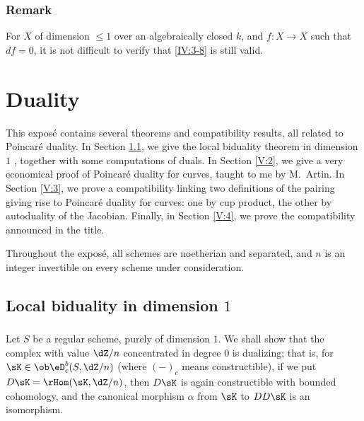 \documentclass[oneside]{book}
\begin{document}
\subsection{Remark}\label{IV:3-9}

For $X$ of dimension $\leqslant 1$ over an algebraically closed $k$, and
$f:X\to X$ such that $d f=0$, it is not difficult to verify that
\ref{IV:3-8} is still valid.



\chapter{Duality}\label{V}

This exposé contains several theorems and compatibility results, all related
to Poincaré duality. In Section \ref{V:1}, we give the local biduality theorem
in dimension $1$ \cite[I.5.1]{sga5}, together with some computations of
duals. In Section \ref{V:2}, we give a very economical proof of Poincaré
duality for curves, taught to me by M.\ Artin. In Section \ref{V:3}, we prove
a compatibility linking two definitions of the pairing giving rise to
Poincaré duality for curves: one by cup product, the other by autoduality of
the Jacobian. Finally, in Section \ref{V:4}, we prove the compatibility
announced in the title.

Throughout the exposé, all schemes are noetherian and separated, and $n$ is
an integer invertible on every scheme under consideration.


\section{Local biduality in dimension \texorpdfstring{$1$}{1}}\label{V:1}


\subsection{}\label{V:1-1}

Let $S$ be a regular scheme, purely of dimension $1$. We shall show that the
complex with value $\dZ/n$ concentrated in degree $0$ is dualizing; that is,
for $\sK\in \ob\eD_c^b(S,\dZ/n)$ (where $(-)_c$ means constructible), if we
put $D\sK=\rHom(\sK,\dZ/n)$, then $D\sK$ is again
constructible with bounded cohomology, and the canonical morphism $\alpha$
from $\sK$ to $D D\sK$ is an isomorphism.
\end{document}
